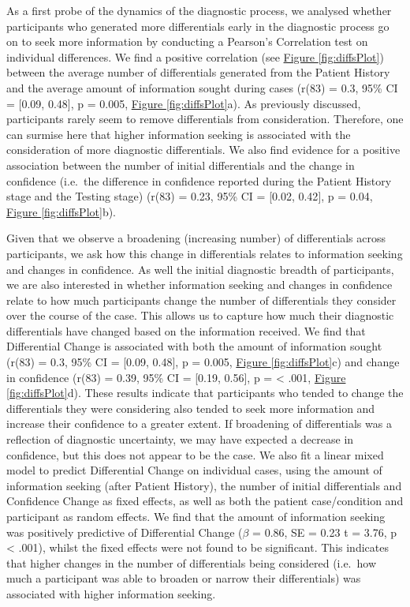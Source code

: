 \documentclass[a4paper, nobind]{templates/ociamthesis}
\begin{document}
As a first probe of the dynamics of the diagnostic process, we analysed whether participants who generated more differentials early in the diagnostic process go on to seek more information by conducting a Pearson's Correlation test on individual differences. We find a positive correlation (see \hyperref[fig:diffsPlot]{Figure \ref{fig:diffsPlot}}) between the average number of differentials generated from the Patient History and the average amount of information sought during cases (r(83) = 0.3, 95\% CI = {[}0.09, 0.48{]}, p = 0.005, \hyperref[fig:diffsPlot]{Figure \ref{fig:diffsPlot}}a). As previously discussed, participants rarely seem to remove differentials from consideration. Therefore, one can surmise here that higher information seeking is associated with the consideration of more diagnostic differentials. We also find evidence for a positive association between the number of initial differentials and the change in confidence (i.e.~the difference in confidence reported during the Patient History stage and the Testing stage) (r(83) = 0.23, 95\% CI = {[}0.02, 0.42{]}, p = 0.04, \hyperref[fig:diffsPlot]{Figure \ref{fig:diffsPlot}}b).

\hfill\break
Given that we observe a broadening (increasing number) of differentials across participants, we ask how this change in differentials relates to information seeking and changes in confidence. As well the initial diagnostic breadth of participants, we are also interested in whether information seeking and changes in confidence relate to how much participants change the number of differentials they consider over the course of the case. This allows us to capture how much their diagnostic differentials have changed based on the information received. We find that Differential Change is associated with both the amount of information sought (r(83) = 0.3, 95\% CI = {[}0.09, 0.48{]}, p = 0.005, \hyperref[fig:diffsPlot]{Figure \ref{fig:diffsPlot}}c) and change in confidence (r(83) = 0.39, 95\% CI = {[}0.19, 0.56{]}, p = \textless{} .001, \hyperref[fig:diffsPlot]{Figure \ref{fig:diffsPlot}}d). These results indicate that participants who tended to change the differentials they were considering also tended to seek more information and increase their confidence to a greater extent. If broadening of differentials was a reflection of diagnostic uncertainty, we may have expected a decrease in confidence, but this does not appear to be the case. We also fit a linear mixed model to predict Differential Change on individual cases, using the amount of information seeking (after Patient History), the number of initial differentials and Confidence Change as fixed effects, as well as both the patient case/condition and participant as random effects. We find that the amount of information seeking was positively predictive of Differential Change (\(\beta\) = 0.86, SE = 0.23 t = 3.76, p \textless{} .001), whilst the fixed effects were not found to be significant. This indicates that higher changes in the number of differentials being considered (i.e.~how much a participant was able to broaden or narrow their differentials) was associated with higher information seeking.
\end{document}
